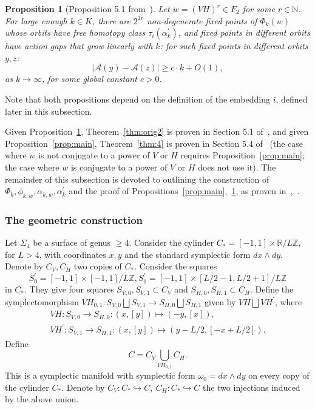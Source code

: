 \documentclass[11pt]{article}
\newenvironment{myequation}
    {
        \begin{equation*}
        \begin{gathered}
    }
    { 
        \end{gathered} 
        \end{equation*}
    }
\newtheorem{prop}[theorem]{Proposition}
\newcommand{\N}{\mathbb{N}}
\newcommand{\Z}{\mathbb{Z}}
\begin{document}
            \begin{prop}[Proposition 5.1 from~\cite{PS14}]
            \label{prop:main2}
                Let $w = (VH)^r \in F_2$ for some $r \in \N$. For large enough $k \in K$, there are $2^{2r}$ non-degenerate fixed points of $\Phi_k(w)$ whose orbits have free homotopy class $\tau_i(\alpha_k^\prime)$, and fixed points in different orbits have action gaps that grow linearly with $k$: for such fixed points in different orbits $y, z$:
                \[
                    | \mathcal{A}(y) - \mathcal{A}(z) | \geq c \cdot k + O(1) ,
                \]
                as $k \to \infty$, for some global constant $c > 0$.
            \end{prop}
            
            Note that both propositions depend on the definition of the embedding $i$, defined later in this subsection.
            
            Given Proposition~\ref{prop:main2}, Theorem~\ref{thm:orig2} is proven in Section 5.1 of~\cite{PS14}, and given Proposition~\ref{prop:main}, Theorem~\ref{thm:4} is proven in Section 5.4 of~\cite{10} (the case where $w$ is not conjugate to a power of $V$ or $H$ requires Proposition~\ref{prop:main}; the case where $w$ is conjugate to a power of $V$ or $H$ does not use it). The remainder of this subsection is devoted to outlining the construction of $\Phi_k, \phi_{k,w}, \alpha_{k,w}, \alpha_k^\prime$ and the proof of Propositions~\ref{prop:main},~\ref{prop:main2}, as proven in~\cite{PS14},~\cite{10}. \\
        
        \subsubsection{The geometric construction}\label{sec:geometric}
            Let $\Sigma_4$ be a surface of genus $\geq 4$. Consider the cylinder $C_*=[-1,1]\times\mathbb{R}/L\mathbb{Z}$, for $L > 4$, with coordinates $x,y$ and the standard symplectic form $dx\wedge dy$. Denote by $C_V,C_H$ two copies of $C_*$. Consider the squares
            \[
                S_0^\prime = [-1,1]\times[-1,1]/L\Z, S_1^\prime = [-1,1]\times[L/2-1,L/2+1]/L\Z
            \]
            in $C_*$. They give four squares $S_{V,0},S_{V,1}\subset C_V$ and $S_{H,0},S_{H,1}\subset C_H$. Define the symplectomorphism $VH_{0,1}:S_{V,0}\bigsqcup S_{V,1} \to S_{H,0} \bigsqcup S_{H,1}$ given by $VH\bigsqcup VH^\prime$, where
            \begin{myequation}
                VH:S_{V,0}\to S_{H,0} : (x,[y]) \mapsto (-y,[x]) ,\\
                VH^\prime : S_{V,1}\to S_{H,1} : (x,[y]) \mapsto (y-L/2, [-x+L/2]) .
            \end{myequation}
            Define
            \[
                C = C_V \bigcup_{VH_{0,1}} C_H .
            \]
            This is a symplectic manifold with symplectic form $\omega_0 = dx \wedge dy$ on every copy of the cylinder $C_*$. Denote by $C_V: C_* \hookrightarrow C, \ C_H: C_* \hookrightarrow C$ the two injections induced by the above union.
            
\end{document}
